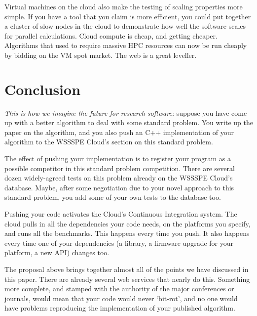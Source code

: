 \documentclass[10pt,conference,final]{IEEEtran}
\begin{document}
Virtual machines on the cloud also make the testing of scaling
properties more simple.  If you have a tool that you claim is more
efficient, you could put together a cluster of slow nodes in the cloud
to demonstrate how well the software scales for parallel calculations.
Cloud compute is cheap, and getting cheaper. Algorithms that used to
require massive HPC resources can now be run cheaply by bidding on the
VM spot market. The web is a great leveller.


\section{Conclusion}
\label{sec:Conclusion} 

{\emph{This is how we imagine the future for research software:}} suppose you
have come up with a better algorithm to deal with some standard
problem.  You write up the paper on the algorithm, and you also push
an C++ implementation of your algorithm to the WSSSPE Cloud's section
on this standard problem.

The effect of pushing your implementation is to register your program
as a possible competitor in this standard problem competition. There
are several dozen widely-agreed tests on this problem already on the
WSSSPE Cloud's database. Maybe, after some negotiation due to your
novel approach to this standard problem, you add some of your
own tests to the database too.

Pushing your code activates the Cloud's Continuous Integration
system.  The cloud pulls in all the dependencies your code needs, on
the platforms you specify, and runs all the benchmarks. This happens
every time you push. It also happens every time one of your
dependencies (a library, a firmware upgrade for your platform, a new
API) changes too.

The proposal above brings together almost all of the points we have
discussed in this paper. There are already several web services that
nearly do this. Something more complete, and stamped with the
authority of the major conferences or journals, would mean that your
code would never `bit-rot', and no one would have problems reproducing
the implementation of your published algorithm.






\end{document}
